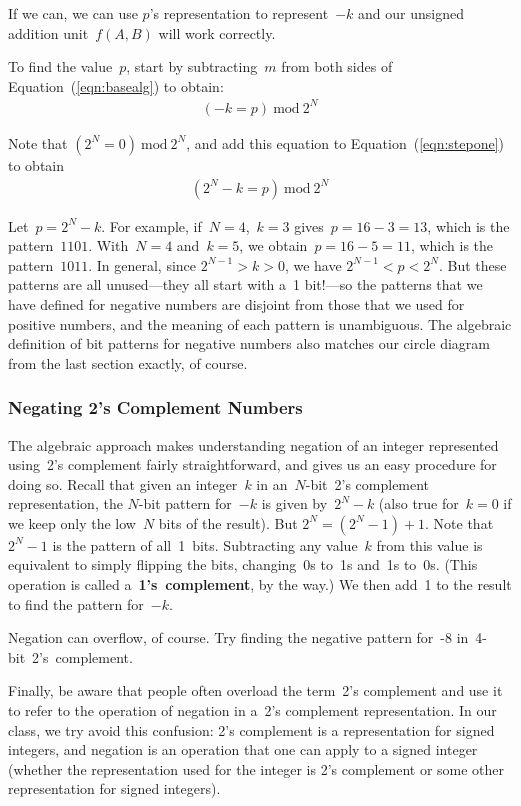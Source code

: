 If we can, we can use $p$'s representation to represent~$-k$ and our
unsigned addition unit~$f(A,B)$ will work correctly.

To find the value~$p$, start by subtracting~$m$ from both sides of
Equation~(\ref{eqn:basealg}) to obtain:
%
\begin{eqnarray}
(-k = p)~\mbox{mod}~2^N\label{eqn:stepone}
\end{eqnarray}

Note that $(2^N=0)~\mbox{mod}~2^N$, and add this equation to 
Equation~(\ref{eqn:stepone}) to obtain
%
\begin{eqnarray*}
(2^N-k = p)~\mbox{mod}~2^N
\end{eqnarray*}

Let~$p=2^N-k$.  
%
For example, if~$N=4$,~$k=3$ gives~$p=16-3=13$, which is the pattern~$1101$.
With~$N=4$ and~$k=5$, we obtain~$p=16-5=11$, which is the pattern~$1011$.
In general, since
$2^{N-1}>k>0$, 
we have $2^{N-1}<p<2^N$.  But these patterns are all unused---they all
start with a~1 bit!---so the patterns that we have defined for negative
numbers are disjoint from those that we used for positive numbers, and
the meaning of each pattern is unambiguous.
%
The algebraic definition of bit patterns for negative numbers
also matches our circle diagram from the last
section exactly, of course.\\

\pagebreak

\subsubsection{Negating 2's Complement Numbers}

The algebraic approach makes understanding negation of an integer
represented using~2's complement fairly straightforward, and gives 
us an easy procedure for doing so.
Recall that given an integer~$k$ in an~\mbox{$N$-bit}~2's complement
representation, the \mbox{$N$-bit} pattern for~$-k$ is given by~$2^N-k$ 
(also true for~$k=0$ if we keep only the low~$N$ bits of the result).  
But $2^N=(2^N-1)+1$.  Note that $2^N-1$ is the pattern of
all~1~bits.  Subtracting any value~$k$ from this value is equivalent
to simply flipping the bits, changing~0s to~1s and~1s to~0s.
(This operation is called a~{\bf 1's~complement}, by the way.)
We then add~1 to the result to find the pattern for~$-k$.

Negation can overflow, of course.  Try finding the negative pattern for~-8 
in~\mbox{4-bit}~2's~complement.

Finally, be aware that people often overload the term~2's complement
and use it to refer to the operation of negation in a~2's complement
representation.  In our class, we try avoid this confusion: 2's complement
is a representation for signed integers, and negation is an operation
that one can apply to a signed integer (whether the representation used
for the integer is 2's complement or some other representation for signed
integers).

\vfill

\pagebreak


